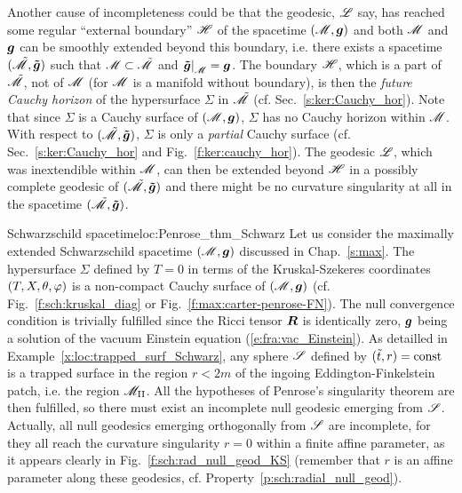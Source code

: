 Another cause of incompleteness could be
that the geodesic, $\mathscr{L}$ say, has reached some regular ``external boundary'' $\mathscr{H}$
of the spacetime $(\mathscr{M},\bm{g})$
and both $\mathscr{M}$ and $\bm{g}$ can be smoothly extended beyond this boundary, i.e.
there exists a spacetime $(\tilde{\mathscr{M}}, \bm{\tilde{g}})$ such that $\mathscr{M} \subset \tilde{\mathscr{M}}$
and $\left. \bm{\tilde{g}} \right| _{\mathscr{M}} = \bm{g}$. The boundary $\mathscr{H}$, which is a part of
$\tilde{\mathscr{M}}$, not of $\mathscr{M}$ (for $\mathscr{M}$ is a manifold without boundary), is then the
\emph{future Cauchy horizon}  of the hypersurface $\Sigma$
in $\tilde{\mathscr{M}}$ (cf. Sec.~\ref{s:ker:Cauchy_hor}).
Note that since $\Sigma$ is a Cauchy surface of $(\mathscr{M},\bm{g})$,
$\Sigma$ has no Cauchy horizon within $\mathscr{M}$. With respect to $(\tilde{\mathscr{M}}, \bm{\tilde{g}})$,
$\Sigma$ is only a \emph{partial} Cauchy surface (cf. Sec.~\ref{s:ker:Cauchy_hor}
and Fig.~\ref{f:ker:cauchy_hor}).
The geodesic $\mathscr{L}$, which was inextendible within $\mathscr{M}$, can then be extended beyond
$\mathscr{H}$ in a possibly complete geodesic of $(\tilde{\mathscr{M}},\bm{\tilde{g}})$ and
there might be no curvature singularity at all in the spacetime $(\tilde{\mathscr{M}},\bm{\tilde{g}})$.

\begin{texample}{Schwarzschild spacetime}{loc:Penrose_thm_Schwarz}
Let us consider the maximally extended Schwarzschild spacetime $(\mathscr{M},\bm{g})$
discussed in Chap.~\ref{s:max}.
The hypersurface $\Sigma$ defined by $T=0$ in terms of the Kruskal-Szekeres coordinates
$(T,X,\theta,\varphi)$ is a non-compact Cauchy surface of $(\mathscr{M},\bm{g})$ (cf. Fig.~\ref{f:sch:kruskal_diag}
or Fig.~\ref{f:max:carter-penrose-FN}).
The null convergence condition
is trivially fulfilled since the Ricci tensor $\bm{R}$
is identically zero, $\bm{g}$ being a solution of the vacuum Einstein equation
(\ref{e:fra:vac_Einstein}). As detailled in Example~\ref{x:loc:trapped_surf_Schwarz},
any sphere $\mathscr{S}$ defined by $({\tilde t},r) = \mathrm{const}$ is a trapped surface in the region $r<2 m$
of the ingoing Eddington-Finkelstein patch, i.e. the region $\mathscr{M}_{\rm II}$.
All the hypotheses of Penrose's singularity theorem are then fulfilled,
so there must exist an incomplete null geodesic emerging from $\mathscr{S}$.
Actually, all null geodesics emerging orthogonally from $\mathscr{S}$ are incomplete,
for they all reach the curvature singularity $r=0$ within a finite affine
parameter, as it appears clearly in Fig.~\ref{f:sch:rad_null_geod_KS}
(remember that $r$ is an affine parameter along these geodesics, cf.
Property~\ref{p:sch:radial_null_geod}).
\end{texample}


